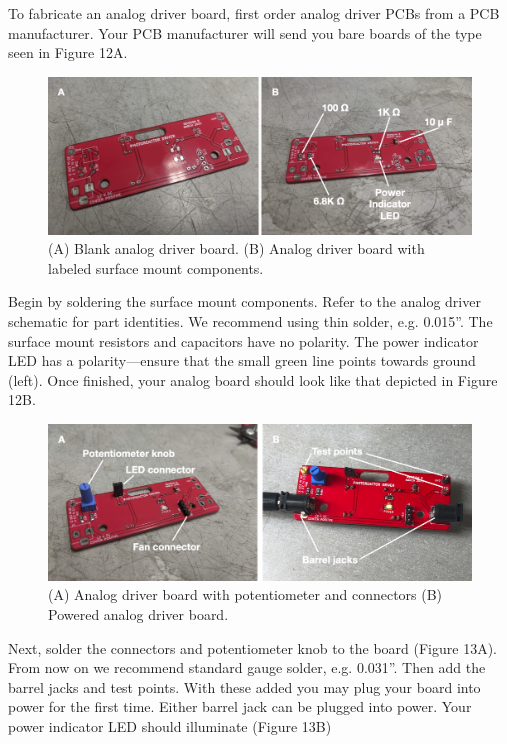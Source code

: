 \documentclass[11pt]{article}
\begin{document}
To fabricate an analog driver board, first order analog driver PCBs from a PCB manufacturer. Your PCB manufacturer will send you bare boards of the type seen in Figure 12A.

\begin{figure}[H]
	\centering
	\includegraphics[width=\textwidth]{"./fig12.png"}
	\caption{(A) Blank analog driver board. (B) Analog driver board with labeled surface mount components.}
\end{figure}

Begin by soldering the surface mount components.
Refer to the analog driver schematic for part identities.
We recommend using thin solder, e.g. 0.015''.
The surface mount resistors and capacitors have no polarity.
The power indicator LED has a polarity---ensure that the small green line points towards ground (left).
Once finished, your analog board should look like that depicted in Figure 12B.

\begin{figure}[H]
	\centering
	\includegraphics[width=\textwidth]{"./fig13.png"}
	\caption{(A) Analog driver board with potentiometer and connectors (B) Powered analog driver board.}
\end{figure}

Next, solder the connectors and potentiometer knob to the board (Figure 13A).
From now on we recommend standard gauge solder, e.g. 0.031''.
Then add the barrel jacks and test points.
With these added you may plug your board into power for the first time.
Either barrel jack can be plugged into power.
Your power indicator LED should illuminate (Figure 13B)
\end{document}
